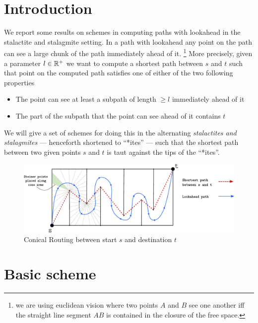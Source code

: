 \section{Introduction}%



We report some results on schemes in computing paths with lookahead in the stalactite and stalagmite setting. In a path with lookahead
any point on the path can see a large chunk of the path immediately ahead of it. \footnote{we are using euclidean vision where two points $A$ and $B$ see one another
iff the straight line segment $AB$ is contained in the closure of the free space. } More precisely, given a parameter $l\in \mathbb{R}^{+}$ we want to compute a shortest 
path between $s$ and $t$ such that point on the computed path satisfies one of either of the two following properties


\begin{itemize}
\item The point can see at least a subpath of length $\geq l$ immediately ahead of it
\item The part of the subpath that the point can see ahead of it contains $t$
\end{itemize}

We will give a set of schemes for doing this in the alternating \textit{stalactites and stalagmites} --- henceforth shortened to ``*ites'' --- such that the shortest path 
between two given points $s$ and $t$ is taut against the tips of the ``*ites''. 



\begin{figure}[H]
\centering
\includegraphics[width=16cm]{miscimages/stalactites-stalagmites.pdf}
\caption{Conical Routing between start $s$ and destination $t$}
\label{fig:conical-routing}
\end{figure}



\section{Basic scheme}



